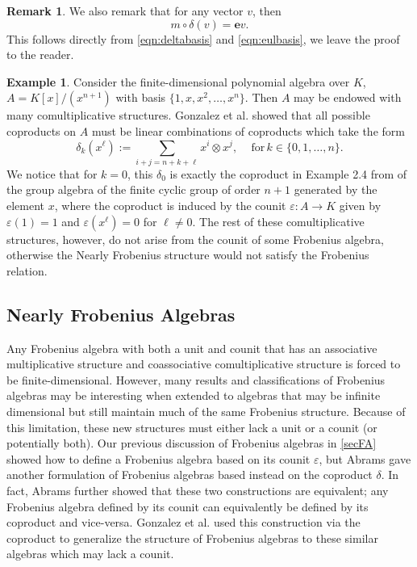 \documentclass{amsart}
\newcommand{\be}{\begin{equation}}
\newcommand{\ee}{\end{equation}}
\newcommand{\tensor}{\otimes}
\newcommand{\eps}{\varepsilon}
\newcommand{\eul}{\mathbf{e}}
\theoremstyle{definition}
\newtheorem{Ex}[Lem]{Example}
\newtheorem{Rmk}[Lem]{Remark}
\begin{document}
\begin{Rmk}
    We also remark that for any vector $v$, then
    \be
    m\circ \delta(v)=\eul v.
    \ee
    This follows directly from \ref{eqn:deltabasis} and \ref{eqn:eulbasis}, we leave the proof to the reader.
\end{Rmk}



\begin{Ex}
    Consider the finite-dimensional polynomial algebra over $K$, $A=K[x]/(x^{n+1})$ with basis $\{1,x,x^2,\ldots,x^n\}$. Then $A$ may be endowed with many comultiplicative structures. Gonzalez et al. \cite{GLSU} showed that all possible coproducts on $A$ must be linear combinations of coproducts which take the form
    \be
    \delta_k(x^\ell):=\sum_{i+j=n+k+\ell}x^i \tensor x^j,\quad\mathrm{\,for\,} k\in\{0,1,\ldots,n\}.
    \ee
    We notice that for $k=0$, this $\delta_0$ is exactly the coproduct in Example 2.4 from \cite{DaDu} of the group algebra of the finite cyclic group of order $n+1$ generated by the element $x$, where the coproduct is induced by the counit $\eps:A\to K$ given by $\eps(1)=1$ and $\eps(x^\ell)=0$ for $\ell\neq 0$. The rest of these comultiplicative structures, however, do not arise from the counit of some Frobenius algebra, otherwise the Nearly Frobenius structure would not satisfy the Frobenius relation.
\end{Ex}


\subsection{Nearly Frobenius Algebras}
Any Frobenius algebra with both a unit and counit that has an associative multiplicative structure and coassociative comultiplicative structure is forced to be finite-dimensional. However, many results and classifications of Frobenius algebras may be interesting when extended to algebras that may be infinite dimensional but still maintain much of the same Frobenius structure. Because of this limitation, these new structures must either lack a unit or a counit (or potentially both). Our previous discussion of Frobenius algebras in \ref{secFA} showed how to define a Frobenius algebra based on its counit $\eps$, but Abrams \cite{Abrams} gave another formulation of Frobenius algebras based instead on the coproduct $\delta$. In fact, Abrams further showed that these two constructions are equivalent; any Frobenius algebra defined by its counit can equivalently be defined by its coproduct and vice-versa. Gonzalez et al. \cite{GLSU} used this construction via the coproduct to generalize the structure of Frobenius algebras to these similar algebras which may lack a counit.
\end{document}
